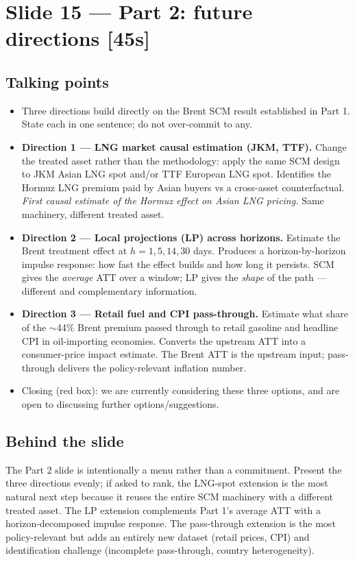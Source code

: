 \documentclass[11pt,a4paper]{article}
\newcommand{\timetag}[1]{\hfill\textcolor{muted}{\small[#1]}}
\newcommand{\highlight}[1]{\textcolor{accent}{\textbf{#1}}}
\begin{document}
\section{Slide 15 --- Part 2: future directions \timetag{45s}}

\subsection{Talking points}
\begin{itemize}
  \item Three directions build directly on the Brent SCM result established in Part 1. State each in one sentence; do not over-commit to any.
  \item \highlight{Direction 1 --- LNG market causal estimation (JKM, TTF).} Change the treated asset rather than the methodology: apply the same SCM design to JKM Asian LNG spot and/or TTF European LNG spot. Identifies the Hormuz LNG premium paid by Asian buyers vs a cross-asset counterfactual. \emph{First causal estimate of the Hormuz effect on Asian LNG pricing.} Same machinery, different treated asset.
  \item \highlight{Direction 2 --- Local projections (LP) across horizons.} Estimate the Brent treatment effect at $h = 1, 5, 14, 30$ days. Produces a horizon-by-horizon impulse response: how fast the effect builds and how long it persists. SCM gives the \emph{average} ATT over a window; LP gives the \emph{shape} of the path --- different and complementary information.
  \item \highlight{Direction 3 --- Retail fuel and CPI pass-through.} Estimate what share of the $\sim$44\% Brent premium passed through to retail gasoline and headline CPI in oil-importing economies. Converts the upstream ATT into a consumer-price impact estimate. The Brent ATT is the upstream input; pass-through delivers the policy-relevant inflation number.
  \item Closing (red box): we are currently considering these three options, and are open to discussing further options/suggestions.
\end{itemize}

\subsection{Behind the slide}
The Part 2 slide is intentionally a menu rather than a commitment. Present the three directions evenly; if asked to rank, the LNG-spot extension is the most natural next step because it reuses the entire SCM machinery with a different treated asset. The LP extension complements Part 1's average ATT with a horizon-decomposed impulse response. The pass-through extension is the most policy-relevant but adds an entirely new dataset (retail prices, CPI) and identification challenge (incomplete pass-through, country heterogeneity).
\end{document}
